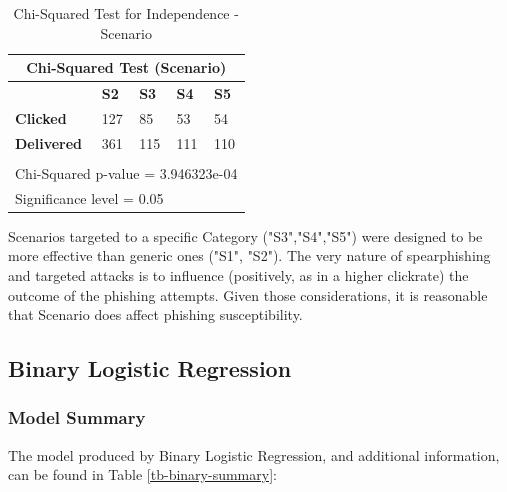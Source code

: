 \documentclass[a4paper]{article}
\begin{document}
\begingroup
\renewcommand{\arraystretch}{1.25}
\begin{table}[ht]
\begin{center}
    \begin{tabular}{ | l | l | l | l | l | }
    \hline
    \multicolumn{5}{|c|}{Chi-Squared Test (Scenario)} \\ \hline
    \textbf{} & \textbf{S2} & \textbf{S3} & \textbf{S4} & \textbf{S5} \\
    \hline
    \textbf{Clicked} & 127 & 85 & 53 & 54 \\ \hline
    \textbf{Delivered} & 361 & 115 & 111 & 110 \\ \hline
    \multicolumn{5}{l}{} \\ \hline
    \multicolumn{5}{|l|}{Chi-Squared p-value = 3.946323e-04} \\ \multicolumn{5}{|l|}{Significance level = 0.05} \\
    \hline
    \end{tabular}
\end{center}
\caption{Chi-Squared Test for Independence - Scenario}
\label{tb-chi-scenario}
\end{table}

\noindent
Scenarios targeted to a specific Category ("S3","S4","S5") were designed to be more effective than generic ones ("S1", "S2"). The very nature of spearphishing and targeted attacks is to influence (positively, as in a higher clickrate) the outcome of the phishing attempts. Given those considerations, it is reasonable that Scenario does affect phishing susceptibility.

\newpage

\subsection{Binary Logistic Regression}

\subsubsection{Model Summary}

The model produced by Binary Logistic Regression, and additional information, can be found in Table \ref{tb-binary-summary}:

\bigskip
\end{document}
